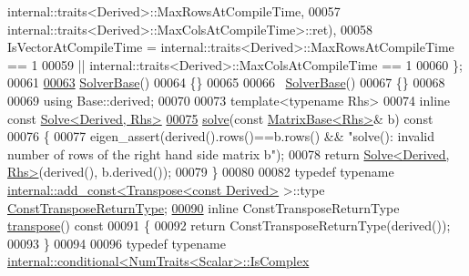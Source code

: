 \begin{DoxyCode}
      internal::traits<Derived>::MaxRowsAtCompileTime,
00057                                                              
      internal::traits<Derived>::MaxColsAtCompileTime>::ret),
00058       IsVectorAtCompileTime = internal::traits<Derived>::MaxRowsAtCompileTime == 1
00059                            || internal::traits<Derived>::MaxColsAtCompileTime == 1
00060     \};
00061 
\hyperlink{class_eigen_1_1_solver_base_a4d5e5baddfba3790ab1a5f247dcc4dc1}{00063}     \hyperlink{class_eigen_1_1_solver_base_a4d5e5baddfba3790ab1a5f247dcc4dc1}{SolverBase}()
00064     \{\}
00065 
00066     ~\hyperlink{class_eigen_1_1_solver_base}{SolverBase}()
00067     \{\}
00068 
00069     \textcolor{keyword}{using} Base::derived;
00070 
00073     \textcolor{keyword}{template}<\textcolor{keyword}{typename} Rhs>
00074     \textcolor{keyword}{inline} \textcolor{keyword}{const} \hyperlink{group___core___module_class_eigen_1_1_solve}{Solve<Derived, Rhs>}
\hyperlink{class_eigen_1_1_solver_base_a7fd647d110487799205df6f99547879d}{00075}     \hyperlink{class_eigen_1_1_solver_base_a7fd647d110487799205df6f99547879d}{solve}(\textcolor{keyword}{const} \hyperlink{group___core___module_class_eigen_1_1_matrix_base}{MatrixBase<Rhs>}& b)\textcolor{keyword}{ const}
00076 \textcolor{keyword}{    }\{
00077       eigen\_assert(derived().rows()==b.rows() && \textcolor{stringliteral}{"solve(): invalid number of rows of the right hand side
       matrix b"});
00078       \textcolor{keywordflow}{return} \hyperlink{group___core___module_class_eigen_1_1_solve}{Solve<Derived, Rhs>}(derived(), b.derived());
00079     \}
00080 
00082     \textcolor{keyword}{typedef} \textcolor{keyword}{typename} \hyperlink{struct_eigen_1_1internal_1_1add__const}{internal::add\_const<Transpose<const Derived>}
       >::type \hyperlink{group___core___module_class_eigen_1_1_transpose}{ConstTransposeReturnType};
\hyperlink{class_eigen_1_1_solver_base_a732e75b5132bb4db3775916927b0e86c}{00090}     \textcolor{keyword}{inline} ConstTransposeReturnType \hyperlink{class_eigen_1_1_solver_base_a732e75b5132bb4db3775916927b0e86c}{transpose}()\textcolor{keyword}{ const}
00091 \textcolor{keyword}{    }\{
00092       \textcolor{keywordflow}{return} ConstTransposeReturnType(derived());
00093     \}
00094 
00096     \textcolor{keyword}{typedef} \textcolor{keyword}{typename} \hyperlink{struct_eigen_1_1internal_1_1conditional}{internal::conditional<NumTraits<Scalar>::IsComplex}

\end{DoxyCode}
